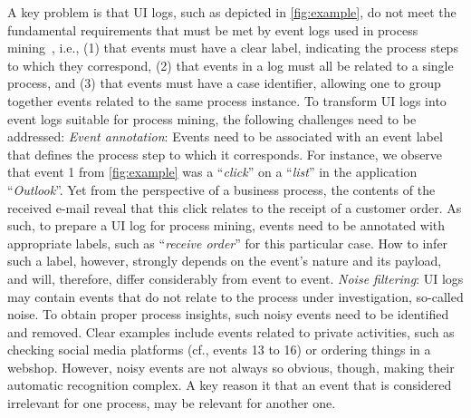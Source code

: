  A key problem is that UI logs, such as depicted in \autoref{fig:example}, do not meet the fundamental requirements that must be met by event logs used in process mining~\cite{van2016data}, i.e., (1) that events must have a clear label, indicating the process steps to which they correspond, (2) that events in a log must all be related to a single process, and (3) that events must have a case identifier, allowing one to group together events related to the same process instance. To transform UI logs into event logs suitable for process mining, the following challenges need to be addressed:
\vspace{0.2em}
\newline%
\textit{Event annotation}: Events need to be associated with an event label that defines the process step to which it corresponds. For instance, we observe that event 1 from \autoref{fig:example} was a ``\textit{click}'' on a ``\textit{list}'' in the application ``\textit{Outlook}''. Yet from the perspective of a business process, the contents of the received e-mail reveal that this click relates to the receipt of a customer order. As such, to prepare a UI log for process mining, events need to be annotated with appropriate labels, such as ``\emph{receive order}'' for this particular case. How to infer such a label, however, strongly depends on the event's nature and its payload, and will, therefore, differ considerably from event to event.
\vspace{0.2em}
\newline%
\noindent \textit{Noise filtering}: 
UI logs may contain events that do not relate to the process under investigation, so-called noise. To obtain proper process insights, such noisy events need to be identified and removed. Clear examples include events related to private activities, such as checking social media platforms (cf., events 13 to 16) or ordering things in a webshop. 
However, noisy events are not always so obvious, though, making their automatic recognition complex.
A key reason it that an event that is considered irrelevant for one process, may be relevant for another one.
